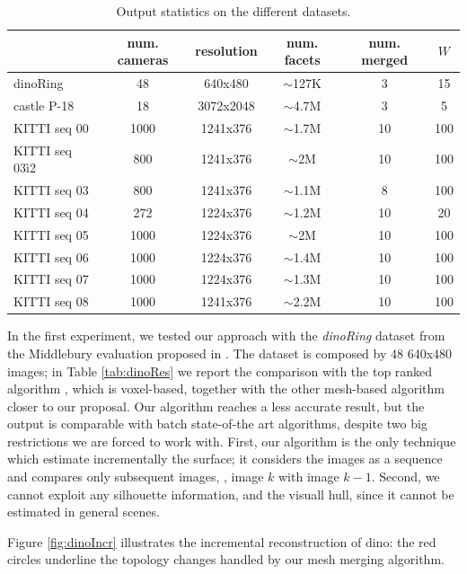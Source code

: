 \begin{table}[t]
\normalsize
\centering
\setlength{\tabcolsep}{1px}
  \caption{Output statistics on the different datasets.}
  \label{fig:expData}
\begin{tabular}{lccccc}
&num. cameras& resolution&num. facets& num. merged &$W$ \\
\hline
dinoRing&48&640x480&$\sim$127K&3&15\\
castle P-18&18&3072x2048&$\sim$4.7M&3&5\\
KITTI seq 00&1000& 1241x376&$\sim$1.7M&10&100\\
KITTI seq 03ì2&800& 1241x376&$\sim$2M&10&100\\
KITTI seq 03&800& 1241x376&$\sim$1.1M&8&100\\
KITTI seq 04&272& 1224x376&$\sim$1.2M&10&20\\
KITTI seq 05&1000& 1224x376&$\sim$2M&10&100\\
KITTI seq 06&1000& 1224x376&$\sim$1.4M&10&100\\
KITTI seq 07&1000& 1224x376&$\sim$1.3M&10&100\\
KITTI seq 08&1000& 1241x376&$\sim$2.2M&10&100\\
\end{tabular}
\end{table}

In the first experiment, we tested our approach with the \emph{dinoRing} dataset  from the Middlebury evaluation proposed in \cite{seitz2006comparison}. 
The dataset is composed by 48 640x480 images; in Table \ref{tab:dinoRes} we report the comparison with the top ranked algorithm \cite{savinov2016semantic}, which is voxel-based, together with the other mesh-based algorithm closer to our proposal.
Our algorithm reaches a less accurate result, but  the output is comparable with batch state-of-the art algorithms, despite two big restrictions we are forced to work with.
First, our algorithm is the only technique  which estimate incrementally the surface; it considers the images as a sequence and compares only subsequent images, \ie, image $k$ with image $k-1$.
Second, we cannot exploit any silhouette information, and the visuall hull, since it cannot be estimated in general scenes.

Figure \ref{fig:dinoIncr} illustrates the incremental reconstruction of dino: the red circles underline the topology changes handled by our mesh merging algorithm.

